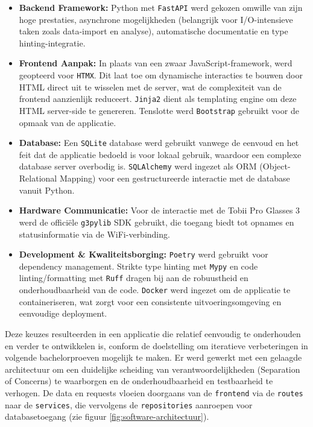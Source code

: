 \begin{itemize}
    \item \textbf{Backend Framework:} Python met \texttt{FastAPI} werd gekozen omwille van zijn hoge prestaties, asynchrone mogelijkheden (belangrijk voor I/O-intensieve taken zoals data-import en analyse), automatische documentatie en type hinting-integratie.
    \item \textbf{Frontend Aanpak:} In plaats van een zwaar JavaScript-framework, werd geopteerd voor \texttt{HTMX}. Dit laat toe om dynamische interacties te bouwen door HTML direct uit te wisselen met de server, wat de complexiteit van de frontend aanzienlijk reduceert. \texttt{Jinja2} dient als templating engine om deze HTML server-side te genereren. Tenslotte werd \texttt{Bootstrap} gebruikt voor de opmaak van de applicatie.
    \item \textbf{Database:} Een \texttt{SQLite} database werd gebruikt vanwege de eenvoud en het feit dat de applicatie bedoeld is voor lokaal gebruik, waardoor een complexe database server overbodig is. \texttt{SQLAlchemy} werd ingezet als ORM (Object-Relational Mapping) voor een gestructureerde interactie met de database vanuit Python.
    \item \textbf{Hardware Communicatie:} Voor de interactie met de Tobii Pro Glasses 3 werd de officiële \texttt{g3pylib} SDK gebruikt, die toegang biedt tot opnames en statusinformatie via de WiFi-verbinding.
    \item \textbf{Development \& Kwaliteitsborging:} \texttt{Poetry} werd gebruikt voor dependency management. Strikte type hinting met \texttt{Mypy} en code linting/formatting met \texttt{Ruff} dragen bij aan de robuustheid en onderhoudbaarheid van de code. \texttt{Docker} werd ingezet om de applicatie te containeriseren, wat zorgt voor een consistente uitvoeringsomgeving en eenvoudige deployment.
\end{itemize}

Deze keuzes resulteerden in een applicatie die relatief eenvoudig te onderhouden en verder te ontwikkelen is, conform de doelstelling om iteratieve verbeteringen in volgende bachelorproeven mogelijk te maken.
Er werd gewerkt met een gelaagde architectuur om een duidelijke scheiding van verantwoordelijkheden (Separation of Concerns) te waarborgen en de onderhoudbaarheid en testbaarheid te verhogen. 
De data en requests vloeien doorgaans van de \texttt{frontend} via de \texttt{routes} naar de \texttt{services}, die vervolgens de \texttt{repositories} aanroepen voor databasetoegang (zie figuur \ref{fig:software-architectuur}).

